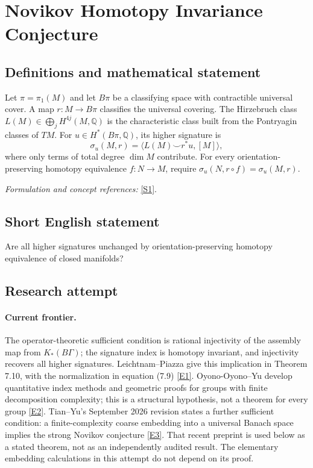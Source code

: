 \documentclass[11pt,a4paper]{article}
\newcommand{\Q}{\mathbb{Q}}
\newcommand{\sref}[2]{\hyperlink{source:#1:#2}{[S#2]}}
\newcommand{\eref}[2]{\hyperlink{extra:#1:#2}{[E#2]}}
\newif\ifshowcatalogue
\newcommand{\cataloguescope}[1]{\ifshowcatalogue
 \paragraph{Exact scope in the supplied catalogue.}
 \begin{quote}\small #1\end{quote}\fi}
\numberwithin{equation}{section}
\begin{document}
\setcounter{section}{0}
\clearpage
\section*{\texorpdfstring{Novikov Homotopy Invariance Conjecture}{Novikov Homotopy Invariance Conjecture}}\label{30001499}
\subsection{Definitions and mathematical statement}
Let $\pi=\pi_1(M)$ and let $B\pi$ be a classifying space with contractible universal cover. A map $r:M\to B\pi$ classifies the universal covering. The Hirzebruch class $L(M)\in\bigoplus_jH^{4j}(M,\Q)$ is the characteristic class built from the Pontryagin classes of $TM$. For $u\in H^*(B\pi,\Q)$, its higher signature is
\[
 \sigma_u(M,r)=\langle L(M)\smile r^*u,[M]\rangle,
\]
where only terms of total degree $\dim M$ contribute. For every orientation-preserving homotopy equivalence $f:N\to M$, require $\sigma_u(N,r\circ f)=\sigma_u(M,r)$.
\par\smallskip\textit{Formulation and concept references:} \sref{30001499}{1}.
\cataloguescope{For every closed oriented smooth manifold M, every u in H\textasciicircum{}*(B pi\_1(M); Q), and every classifying map r, prove that the higher signature <L(M) cup r\textasciicircum{}*u,[M]> is invariant under orientation-preserving homotopy equivalence.}
\subsection{Short English statement}
Are all higher signatures unchanged by orientation-preserving homotopy equivalence of closed manifolds?
\subsection{Research attempt}

\paragraph{Current frontier.}
The operator-theoretic sufficient condition is rational injectivity of the assembly map from $K_*(B\Gamma)$; the signature index is homotopy invariant, and injectivity recovers all higher signatures. Leichtnam--Piazza give this implication in Theorem 7.10, with the normalization in equation (7.9) \eref{30001499}{1}. Oyono-Oyono--Yu develop quantitative index methods and geometric proofs for groups with finite decomposition complexity; this is a structural hypothesis, not a theorem for every group \eref{30001499}{2}. Tian--Yu's September 2026 revision states a further sufficient condition: a finite-complexity coarse embedding into a universal Banach space implies the strong Novikov conjecture \eref{30001499}{3}. That recent preprint is used below as a stated theorem, not as an independently audited result. The elementary embedding calculations in this attempt do not depend on its proof.
\end{document}
